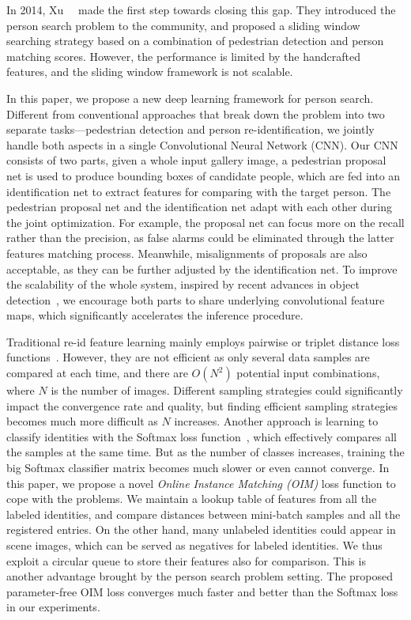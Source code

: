 \documentclass[10pt,twocolumn,letterpaper]{article}
\begin{document}
In 2014, Xu~\etal~\cite{xu2014person} made the first step towards closing this gap. They introduced the person search problem to the community, and proposed a sliding window searching strategy based on a combination of pedestrian detection and person matching scores. However, the performance is limited by the handcrafted features, and the sliding window framework is not scalable.

In this paper, we propose a new deep learning framework for person search. Different from conventional approaches that break down the problem into two separate tasks---pedestrian detection and person re-identification, we jointly handle both aspects in a single Convolutional Neural Network (CNN). Our CNN consists of two parts, given a whole input gallery image, a pedestrian proposal net is used to produce bounding boxes of candidate people, which are fed into an identification net to extract features for comparing with the target person. The pedestrian proposal net and the identification net adapt with each other during the joint optimization. For example, the proposal net can focus more on the recall rather than the precision, as false alarms could be eliminated through the latter features matching process. Meanwhile, misalignments of proposals are also acceptable, as they can be further adjusted by the identification net. To improve the scalability of the whole system, inspired by recent advances in object detection~\cite{ren2015faster}, we encourage both parts to share underlying convolutional feature maps, which significantly accelerates the inference procedure.

Traditional re-id feature learning mainly employs pairwise or triplet distance loss functions~\cite{li2014deepreid,ahmed2015improved,cheng2016person,ding2015deep}. However, they are not efficient as only several data samples are compared at each time, and there are $O(N^2)$ potential input combinations, where $N$ is the number of images. Different sampling strategies could significantly impact the convergence rate and quality, but finding efficient sampling strategies becomes much more difficult as $N$ increases. Another approach is learning to classify identities with the Softmax loss function~\cite{xiao2016learning}, which effectively compares all the samples at the same time. But as the number of classes increases, training the big Softmax classifier matrix becomes much slower or even cannot converge. In this paper, we propose a novel \textit{Online Instance Matching (OIM)} loss function to cope with the problems. We maintain a lookup table of features from all the labeled identities, and compare distances between mini-batch samples and all the registered entries. On the other hand, many unlabeled identities could appear in scene images, which can be served as negatives for labeled identities. We thus exploit a circular queue to store their features also for comparison. This is another advantage brought by the person search problem setting. The proposed parameter-free OIM loss converges much faster and better than the Softmax loss in our experiments.
\end{document}
